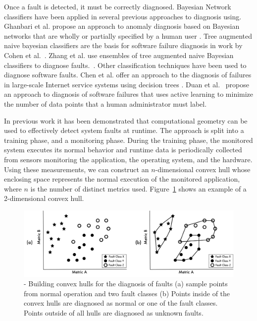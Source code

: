 Once a fault is detected, it must be correctly diagnosed. Bayesian Network classifiers have been applied in several previous approaches to diagnosis using. Ghanbari et al. propose an approach to anomaly diagnosis based on Bayesian networks that are wholly or partially specified by a human user \cite{Ghanbari2008}. Tree augmented naive bayesian classifiers are the basis for software failure diagnosis in work by  Cohen et al.~\cite{Cohen2004}. Zhang et al. use ensembles of tree augmented naive Bayesian classifiers to diagnose faults.~\cite{Zhang2005}. Other classification techniques have been used to diagnose software faults. Chen et al.  offer an approach to the diagnosis of failures in large-scale Internet service systems using decision trees \cite{Chen2004}.  Duan et al.~\cite{Duan} propose an approach to diagnosis of software failures that uses active learning to minimize the number of data points that a human administrator must label.

In previous work it has been demonstrated that computational geometry can be used to effectively detect system faults at runtime\cite{stehle2010,shevertalov2010using}. The approach is split into a training phase, and a monitoring phase. During the training phase, the monitored system executes its normal behavior and runtime data is periodically collected from sensors monitoring the application, the operating system, and the hardware. Using these measurements, we can construct an $n$-dimensional convex hull whose enclosing space represents the normal execution of the monitored application, where $n$ is the number of distinct metrics used. Figure~\ref{fig:class_hulls} shows an example of a 2-dimensional convex hull.

\begin{figure}[tb]
  \centering
  \includegraphics[width=\columnwidth]{images/class_hulls}
  \caption{-  Building convex hulls for the diagnosis of faults (a) sample points from normal operation and two fault classes (b) Points inside of the convex hulls are diagnosed as normal or one of the fault classes. Points outside of all hulls are diagnosed as unknown faults.}
  \label{fig:class_hulls}
\end{figure}

